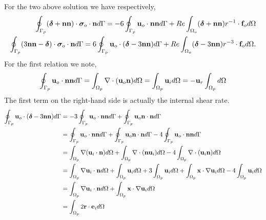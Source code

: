 For the two above solution we have respectively, 
\begin{align}
    \intS[p]{(\bm\delta + \textbf{nn}) \cdot  \bm\sigma_{o}\cdot \textbf{n}}
    =
    - 6\intS[p]{\textbf{u}_{o} \cdot \textbf{nn}}
    + 
    Re\intO[o]{(\bm\delta + \textbf{nn})r^{-1}\cdot \textbf{f}_{o}}\\
    \intS[p]{(3\textbf{nn}-\bm\delta) \cdot  \bm\sigma_{o}\cdot \textbf{n}}
    =
    6\intS[p]{\textbf{u}_{o} \cdot (\bm\delta - 3\textbf{nn})}
    + 
    Re\intO[o]{(\bm\delta - 3\textbf{nn})r^{-3}\cdot \textbf{f}_{o}}.
\end{align}
For the first relation we note, 
\begin{equation}
    \intS[p]{\textbf{u}_{o} \cdot \textbf{nn}}
    =
    \intO[p]{\div (\textbf{u}_{o}\textbf{n})}
    = \intO[p]{ \textbf{u}_i}
    = - \textbf{u}_r \intO[p]{} 
\end{equation}
The first term on the right-hand side is actually the internal shear rate. 
\begin{align*}
    \intS[p]{\textbf{u}_{o} \cdot (\bm\delta - 3\textbf{nn})}
    &=
    - 3 \intS[p]{\textbf{u}_{o}\cdot \textbf{nn}}
    + \intS[p]{\textbf{u}_{o} \textbf{n}\cdot \textbf{n}}\\
    &=
    \intS[p]{\textbf{u}_{o}\cdot \textbf{nn}}
    + \intS[p]{\textbf{u}_{o} \textbf{n}\cdot \textbf{n}}
    - 4 \intS[p]{\textbf{u}_{o}\cdot \textbf{nn}}\\
    &=
    \intO[p]{\grad (\textbf{u}_{i}\cdot \textbf{n})}
    + \intO[p]{\div(\textbf{n}\textbf{u}_{i})}
    - 4 \intO[p]{\div (\textbf{u}_{i}\textbf{n})}\\
    &=
    \intO[p]{\grad \textbf{u}_{i}\cdot \textbf{n}}
    + \intO[p]{\textbf{u}_{i}}
    + 3\intO[p]{\textbf{u}_{i}}
    + \intO[p]{\textbf{x}\cdot \grad\textbf{u}_{i}}
    - 4 \intO[p]{\textbf{u}_{i} }\\
    &=
    \intO[p]{\grad \textbf{u}_{i}\cdot \textbf{n}}
    + \intO[p]{\textbf{x}\cdot \grad\textbf{u}_{i}}
    \\
    &=
    \intO[p]{2 \textbf{r}\cdot \textbf{e}_i}
    \\
\end{align*}

